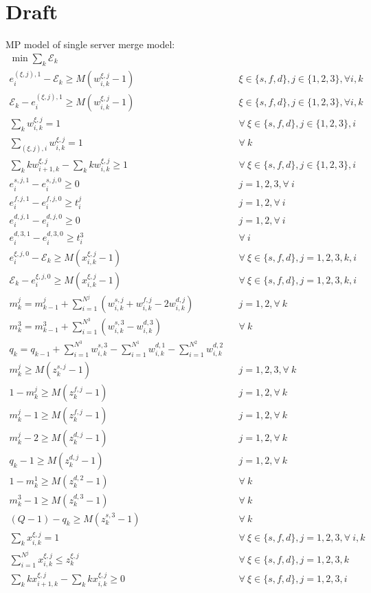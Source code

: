 \documentclass[]{interact}
\theoremstyle{plain}%
\theoremstyle{definition}
\theoremstyle{remark}
\begin{document}
\newpage
\newpage

\section{Draft}
MP model of single server merge model:
\begin{eqnarray}
\min{\sum_{k}\mathcal{E}_k}\\
e^{(\xi,j),1}_i - \mathcal{E}_{k}\ge M(w^{\xi,j}_{i,k}-1)&&\xi\in\{s,f,d\}, j\in\{1,2,3\},\forall i,k \\
\mathcal{E}_{k} - e^{(\xi,j),1}_i\ge M(w^{\xi,j}_{i,k}-1)&&\xi\in\{s,f,d\}, j\in\{1,2,3\},\forall i,k \\
\sum_{k} w^{\xi,j}_{i,k} =1&& \forall\ \xi\in\{s,f,d\}, j\in\{1,2,3\},i\\
\sum_{(\xi,j),i} w^{\xi,j}_{i,k} =1&& \forall\ k\\
\sum_{k} kw^{\xi,j}_{i+1,k} - \sum_{k} kw^{\xi,j}_{i,k} \ge 1&& \forall\  \xi\in\{s,f,d\}, j\in\{1,2,3\},i\\
e^{s,j,1}_{i} - e^{s,j,0}_{i} \ge 0 && j =1,2,3, \forall \ i\\
e^{f,j,1}_{i} - e^{f,j,0}_{i} \ge t^j_{i}&& j =1,2, \forall \ i\\
e^{d,j,1}_{i} - e^{d,j,0}_{i} \ge 0 && j =1,2, \forall \ i\\
e^{d,3,1}_{i} - e^{d,3,0}_{i} \ge t^3_{i}&&\forall \ i \\
e^{\xi,j,0}_i-\mathcal{E}_{k} \ge M(x^{\xi,j}_{i,k}-1)&& \forall\ \xi\in\{s,f,d\},j=1,2,3,k,i\\
\mathcal{E}_{k} -e^{\xi,j,0}_i\ge M(x^{\xi,j}_{i,k}-1)&& \forall\ \xi\in\{s,f,d\},j=1,2,3,k,i\\
m^j_k=m^j_{k-1} + \sum_{i=1}^{N^{j}} (w^{s,j}_{i,k}  + w^{f,j}_{i,k} - 2w^{d,j}_{i,k})&& j=1,2, \forall\ k\\
m^3_k=m^3_{k-1} + \sum_{i=1}^{N^{3}} (w^{s,3}_{i,k} - w^{d,3}_{i,k})&&\forall\ k\\
q_k = q_{k-1} + \sum_{i=1}^{N^{3}} w^{s,3}_{i,k} - \sum_{i=1}^{N^{1}} w^{d,1}_{i,k} - \sum_{i=1}^{N^{2}} w^{d,2}_{i,k}\\
m^j_k \ge M(z^{s,j}_{k}-1)&& j=1,2,3, \forall \ k\\
1- m^j_k \ge M(z^{f,j}_{k}-1)&& j=1,2, \forall \ k\\
m^j_k - 1 \ge M(z^{f,j}_{k}-1)&& j=1,2, \forall \ k\\
m^j_k - 2 \ge M(z^{d,j}_{k}-1)&& j=1,2, \forall \ k\\
q_k - 1 \ge M(z^{d,j}_{k}-1)&&  j=1,2, \forall \ k\\
1 - m^1_k \ge M(z^{d,2}_{k}-1)&& \forall\ k\\
m^3_k - 1 \ge M(z^{d,3}_{k}-1)&& \forall \ k\\
(Q-1) - q_k \ge M(z^{s,3}_{k}-1)&& \forall\ k\\
\sum_{k} x^{\xi,j}_{i,k} =1&& \forall\ \xi\in\{s,f,d\}, j=1,2,3, \forall\ i,k\\
\sum_{i=1}^{N^{j}}x^{\xi,j}_{i,k} \le z^{\xi,j}_{k}&& \forall\ \xi\in\{s,f,d\}, j=1,2,3, k\\
\sum_{k} kx^{\xi,j}_{i+1,k} - \sum_{k} kx^{\xi,j}_{i,k} \ge 0 && \forall\ \xi\in\{s,f,d\}, j=1,2,3, i
\end{eqnarray}
\end{document}
